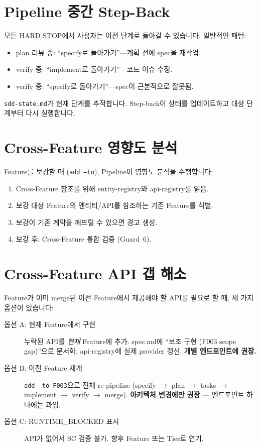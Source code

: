 \documentclass[11pt,a4paper,openright,twoside]{report}
\newcommand{\file}[1]{\texttt{#1}}
\begin{document}
\section{Pipeline 중간 Step-Back}

모든 HARD STOP에서 사용자는 이전 단계로 돌아갈 수 있습니다. 일반적인 패턴:

\begin{itemize}
  \item plan 리뷰 중: ``specify로 돌아가기''---계획 전에 spec을 재작업.
  \item verify 중: ``implement로 돌아가기''---코드 이슈 수정.
  \item verify 중: ``specify로 돌아가기''---spec이 근본적으로 잘못됨.
\end{itemize}

\file{sdd-state.md}가 현재 단계를 추적합니다. Step-back이 상태를 업데이트하고 대상 단계부터 다시 실행합니다.

\section{Cross-Feature 영향도 분석}

Feature를 보강할 때 (\texttt{add --to}), Pipeline이 영향도 분석을 수행합니다:

\begin{enumerate}
  \item Cross-Feature 참조를 위해 entity-registry와 api-registry를 읽음.
  \item 보강 대상 Feature의 엔티티/API를 참조하는 기존 Feature를 식별.
  \item 보강이 기존 계약을 깨뜨릴 수 있으면 경고 생성.
  \item 보강 후: Cross-Feature 통합 검증 (Guard~6).
\end{enumerate}

\section{Cross-Feature API 갭 해소}

Feature가 이미 merge된 이전 Feature에서 제공해야 할 API를 필요로 할 때, 세 가지 옵션이 있습니다:

\begin{description}
  \item[옵션 A: 현재 Feature에서 구현] 누락된 API를 \emph{현재} Feature에 추가. spec.md에 ``보조 구현 (F003 scope gap)''으로 문서화. api-registry에 실제 provider 갱신. \textbf{개별 엔드포인트에 권장.}
  \item[옵션 B: 이전 Feature 재개] \texttt{add --to F003}으로 전체 re-pipeline (specify $\rightarrow$ plan $\rightarrow$ tasks $\rightarrow$ implement $\rightarrow$ verify $\rightarrow$ merge). \textbf{아키텍처 변경에만 권장} --- 엔드포인트 하나에는 과잉.
  \item[옵션 C: RUNTIME\_BLOCKED 표시] API가 없어서 SC 검증 불가. 향후 Feature 또는 Tier로 연기.
\end{description}
\end{document}
